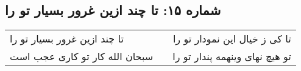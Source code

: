 \begin{center}
\section*{شماره ۱۵: تا چند ازین غرور بسیار تو را}
\label{sec:015}
\begin{longtable}{l p{0.5cm} r}
تا چند ازین غرور بسیار تو را
&&
تا کی ز خیال این نمودار تو را
\\
سبحان الله کار تو کاری عجب است
&&
تو هیچ نهای وینهمه پندار تو را
\\
\end{longtable}
\end{center}
